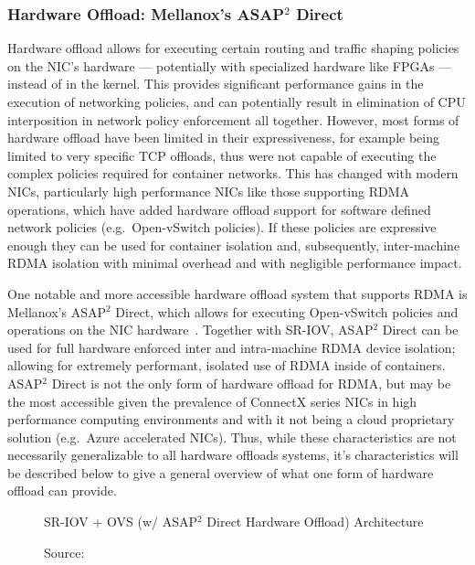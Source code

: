 \documentclass[12pt,titlepage]{article}
\begin{document}
\subsubsection{Hardware Offload: Mellanox's ASAP$^2$ Direct}
Hardware offload allows for executing certain routing and traffic shaping policies on the NIC's hardware --- potentially with specialized hardware like FPGAs --- instead of in the kernel.
This provides significant performance gains in the execution of networking policies, and can potentially result in elimination of CPU interposition in network policy enforcement all together.
However, most forms of hardware offload have been limited in their expressiveness, for example being limited to very specific TCP offloads, thus were not capable of executing the complex policies required for container networks.
This has changed with modern NICs, particularly high performance NICs like those supporting RDMA operations, which have added hardware offload support for software defined network policies (e.g.\ Open-vSwitch policies).
If these policies are expressive enough they can be used for container isolation and, subsequently, inter-machine RDMA isolation with minimal overhead and with negligible performance impact.

One notable and more accessible hardware offload system that supports RDMA is Mellanox's ASAP$^2$ Direct, which allows for executing Open-vSwitch policies and operations on the NIC hardware~\cite{mellanoxdockerovs}.
Together with SR-IOV, ASAP$^2$ Direct can be used for full hardware enforced inter and intra-machine RDMA device isolation;
allowing for extremely performant, isolated use of RDMA inside of containers.
ASAP$^2$ Direct is not the only form of hardware offload for RDMA, but may be the most accessible given the prevalence of ConnectX series NICs in high performance computing environments and with it not being a cloud proprietary solution (e.g.\ Azure accelerated NICs).
Thus, while these characteristics are not necessarily generalizable to all hardware offloads systems, it's characteristics will be described below to give a general overview of what one form of hardware offload can provide.

\begin{figure}
	\centering
	\caption{SR-IOV + OVS (w/ ASAP$^2$ Direct Hardware Offload) Architecture}
	\caption*{Source:~\cite{mellanoxdockerovs}}
\end{figure}
\end{document}
